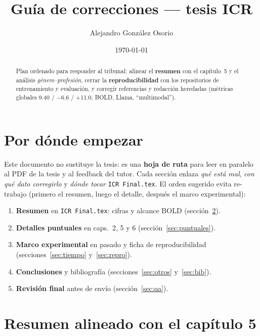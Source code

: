 \documentclass[11pt,a4paper]{article}
\title{Guía de correcciones --- tesis ICR}
\author{Alejandro González Osorio}
\date{\today}
\newcommand{\archivo}[1]{\texttt{\nolinkurl{#1}}}
\begin{document}
\maketitle

\begin{abstract}
\noindent
Plan ordenado para responder al tribunal: alinear el \textbf{resumen} con el capítulo~5 y el análisis
\textit{género--profesión}, cerrar la \textbf{reproducibilidad} con los repositorios de entrenamiento y
evaluación, y corregir referencias y redacción heredadas (métricas globales 9.40 / $-$6.6 / +11.0,
BOLD, Llama, ``multimodal'').
\end{abstract}

\tableofcontents
\clearpage

\section{Por dónde empezar}

Este documento no sustituye la tesis: es una \textbf{hoja de ruta} para leer en paralelo al PDF de la tesis y al feedback del tutor.
Cada sección enlaza \emph{qué está mal}, \emph{con qué dato corregirlo} y \emph{dónde tocar} \archivo{ICR Final.tex}.
El orden sugerido evita re-trabajo (primero el resumen, luego el detalle, después el marco experimental):

\begin{enumerate}[label=\textbf{\arabic*.}, leftmargin=*, itemsep=0.35em]
  \item \textbf{Resumen} en \archivo{ICR Final.tex}: cifras y alcance BOLD (sección~\ref{sec:resumen}).
  \item \textbf{Detalles puntuales} en caps.~2, 5 y 6 (sección~\ref{sec:puntuales}).
  \item \textbf{Marco experimental} en pasado y ficha de reproducibilidad (secciones~\ref{sec:tiempo} y~\ref{sec:repro}).
  \item \textbf{Conclusiones} y bibliografía (secciones~\ref{sec:otros} y~\ref{sec:bib}).
  \item \textbf{Revisión final} antes de envío (sección~\ref{sec:qa}).
\end{enumerate}

\section{Resumen alineado con el capítulo 5}
\label{sec:resumen}
\end{document}
